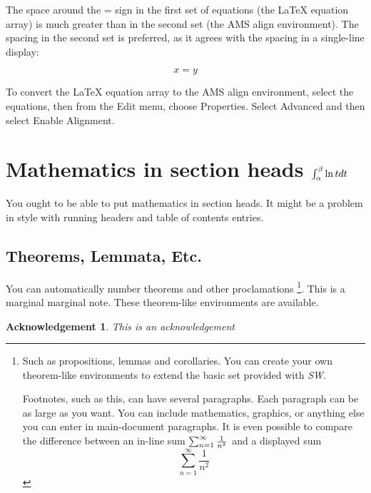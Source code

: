 \documentclass{article}
\newtheorem{acknowledgement}[theorem]{Acknowledgement}
\begin{document}
The space around the = sign in the first set of equations (the \LaTeX{}
equation array) is much greater than in the second set (the AMS align
environment). The spacing in the second set is preferred, as it agrees with
the spacing in a single-line display:

\begin{equation*}
x=y
\end{equation*}

To convert the \LaTeX{} equation array to the AMS align environment, select
the equations, then from the Edit menu, choose Properties. Select Advanced
and then select Enable Alignment.

\section{Mathematics in section heads $\protect\int_{\protect\alpha }^{%
\protect\beta }\ln tdt$}

You ought to be able to put mathematics in section heads. It might be a
problem in style with running headers and table of contents entries.

\subsection{Theorems, Lemmata, Etc.}

\label{theorems}You can automatically number theorems and other proclamations%
\footnote{%
Such as propositions, lemmas and corollaries. You can create your own
theorem-like environments to extend the basic set provided with \textsl{SW}.
\par
Footnotes, such as this, can have several paragraphs. Each paragraph can be
as large as you want. You can include mathematics, graphics, or anything
else you can enter in main-document paragraphs. It is even possible to
compare the difference between an in-line sum $\sum_{n=1}^{\infty }\frac{1}{%
n^{2}}$ and a displayed sum 
\begin{equation*}
\sum_{n=1}^{\infty }\frac{1}{n^{2}}
\end{equation*}%
}. This is a marginal marginal note.%
 These theorem-like
environments are available.

\begin{acknowledgement}
This is an acknowledgement
\end{acknowledgement}
\end{document}
